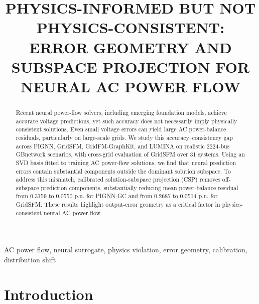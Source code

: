 \documentclass{article}
\title{PHYSICS-INFORMED BUT NOT PHYSICS-CONSISTENT:\\
ERROR GEOMETRY AND SUBSPACE PROJECTION FOR NEURAL AC POWER FLOW}
\begin{document}
\ninept
\maketitle

\begin{abstract}
Recent neural power-flow solvers, including emerging foundation models,
achieve accurate voltage predictions, yet such accuracy does not
necessarily imply physically consistent solutions.
Even small voltage errors can yield large AC power-balance residuals,
particularly on large-scale grids.
We study this accuracy--consistency gap across PIGNN, GridSFM, GridFM-GraphKit, and LUMINA on realistic 2224-bus GBnetwork scenarios, with cross-grid evaluation of GridSFM over 31 systems.
Using an SVD basis fitted to training AC power-flow solutions, we find that neural prediction errors contain substantial components outside the dominant solution subspace.
To address this mismatch,
calibrated solution-subspace projection (CSP) removes off-subspace prediction components,
substantially reducing mean power-balance residual from 0.3159 to 0.0550 p.u. for PIGNN-GC and
from 0.2687 to 0.0514 p.u. for GridSFM.
These results highlight output-error geometry as a critical factor in physics-consistent neural AC power flow.
\end{abstract}







\begin{keywords}
AC power flow, neural surrogate, physics violation, error geometry, calibration, distribution shift
\end{keywords}

\section{Introduction}
\label{sec:introduction}
\end{document}
